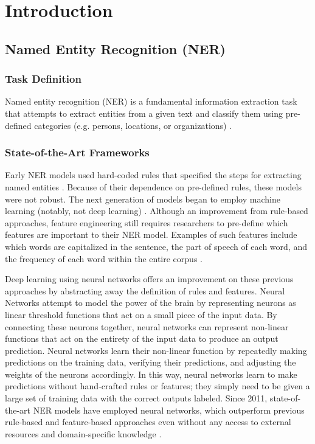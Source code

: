 \addchapheadtotoc
\chapter{Introduction}
\section{Named Entity Recognition (NER)}
\subsection{Task Definition}
Named entity recognition (NER) is a fundamental information extraction task that attempts to extract entities from a given text and classify them using pre-defined categories (e.g. persons, locations, or organizations) \citep{2007Survey}.

\subsection{State-of-the-Art Frameworks}
Early NER models used hard-coded rules that specified the steps for extracting named entities \citep{NeuralNERSurvey}. Because of their dependence on pre-defined rules, these models were not robust. The next generation of models began to employ machine learning (notably, not deep learning) \citep{NeuralNERSurvey}. Although an improvement from rule-based approaches, feature engineering still requires researchers to pre-define which features are important to their NER model. Examples of such features include which words are capitalized in the sentence, the part of speech of each word, and the frequency of each word within the entire corpus \citep{2007Survey}.

Deep learning using neural networks offers an improvement on these previous approaches by abstracting away the definition of rules and features. Neural Networks attempt to model the power of the brain by representing neurons as linear threshold functions that act on a small piece of the input data. By connecting these neurons together, neural networks can represent non-linear functions that act on the entirety of the input data to produce an output prediction. Neural networks learn their non-linear function by repeatedly making predictions on the training data, verifying their predictions, and adjusting the weights of the neurons accordingly. In this way, neural networks learn to make predictions without hand-crafted rules or features; they simply need to be given a large set of training data with the correct outputs labeled. Since 2011, state-of-the-art NER models have employed neural networks, which outperform previous rule-based and feature-based approaches even without any access to external resources and domain-specific knowledge \citep{NeuralNERSurvey}.

